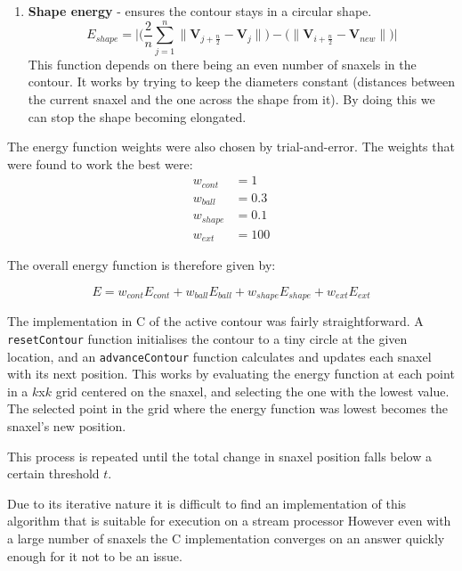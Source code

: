 \begin{enumerate}
	\item \textbf{Shape energy} - ensures the contour stays in a circular shape.
		\begin{equation}
			E_{shape} = \Bigg| \bigg( \frac{2}{n}\sum_{j=1}^n \| \mathbf{V}_{j+\frac{n}{2}} - \mathbf{V}_j \| \bigg) - \bigg( \| \mathbf{V}_{i+\frac{n}{2}} - \mathbf{V}_{new} \| \bigg) \Bigg|
		\end{equation}
		This function depends on there being an even number of snaxels in the contour.
		It works by trying to keep the diameters constant (distances between the current snaxel and the one across the shape from it).
		By doing this we can stop the shape becoming elongated.

\end{enumerate}

\noindent The energy function weights were also chosen by trial-and-error.
The weights that were found to work the best were:
\begin{align*}
	w_{cont} &= 1 \\
	w_{ball} &= 0.3 \\
	w_{shape} &= 0.1 \\
	w_{ext} &= 100
\end{align*}

The overall energy function is therefore given by:

\begin{equation}
	E = w_{cont} E_{cont} + w_{ball} E_{ball} + w_{shape} E_{shape} + w_{ext} E_{ext}
\end{equation}

\bigskip
\noindent The implementation in C of the active contour was fairly straightforward.
A \texttt{resetContour} function initialises the contour to a tiny circle at the given location,
and an \texttt{advanceContour} function calculates and updates each snaxel with its next position.
This works by evaluating the energy function at each point in a $k$x$k$ grid centered on the snaxel,
and selecting the one with the lowest value. \cite{SnakeAlgorithm}
The selected point in the grid where the energy function was lowest becomes the snaxel's new position.

This process is repeated until the total change in snaxel position falls below a certain threshold $t$.

Due to its iterative nature it is difficult to find an implementation of this algorithm that is suitable for execution on a stream processor 
However even with a large number of snaxels the C implementation converges on an answer quickly enough for it not to be an issue.

